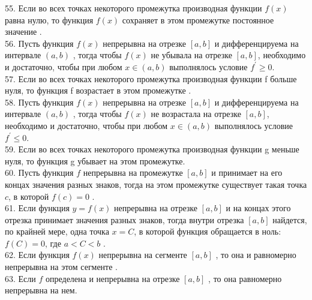 \documentclass[12pt]{article}
\begin{document}
{55. Если во всех точках некоторого промежутка производная функции ${\displaystyle f(x)}$ равна нулю, то функция ${\displaystyle f(x)}$ сохраняет в этом промежутке постоянное значение .\\

56. Пусть функция ${\displaystyle f(x)}$ непрерывна на отрезке  ${\displaystyle [a,b]}$ и дифференцируема на интервале ${\displaystyle (a,b)}$ ,  тогда чтобы ${\displaystyle f(x)}$ не убывала на отрезке ${\displaystyle [a,b]}$, необходимо и достаточно, чтобы при любом ${\displaystyle x \in (a,b)}$ выполнялось условие ${\displaystyle f^{\prime} \geq 0}$.\\

57. Если во всех точках некоторого промежутка производная функции f больше нуля, то функция f возрастает в этом промежутке .\\

58. Пусть функция ${\displaystyle f(x)}$ непрерывна на отрезке  ${\displaystyle [a,b]}$ и дифференцируема на интервале ${\displaystyle (a,b)}$ ,  тогда чтобы ${\displaystyle f(x)}$ не возрастала на отрезке ${\displaystyle [a,b]}$, необходимо и достаточно, чтобы при любом ${\displaystyle x \in (a,b)}$ выполнялось условие ${\displaystyle f^{\prime} \leq 0}$.\\

59. Если во всех точках некоторого промежутка производная функции g меньше нуля, то функция g убывает на этом промежутке.\\

60. Пусть функция ${\displaystyle f}$  непрерывна на промежутке ${\displaystyle [a,b]}$ и принимает на его концах значения разных знаков, тогда на этом промежутке существует такая точка  ${\displaystyle c}$, в которой ${\displaystyle f(c)=0}$ .\\

61. Если функция ${\displaystyle y = f(x)}$ непрерывна на отрезке ${\displaystyle [a, b]}$ и на концах этого отрезка принимает значения разных знаков, тогда внутри отрезка ${\displaystyle [a, b]}$ найдется, по крайней мере, одна точка ${\displaystyle x = C}$, в которой функция обращается в ноль: ${\displaystyle f(C) = 0}$, где ${\displaystyle a < C< b}$ .\\

62. Если функция ${\displaystyle f(x)}$ непрерывна на сегменте ${\displaystyle [a,b]}$ , то она и равномерно непрерывна на этом сегменте .\\

63. Если ${\displaystyle f }$ определена и непрерывна на отрезке ${\displaystyle [a,b]}$ , то она равномерно непрерывна на нем.\\

}
\end{document}

